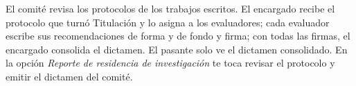 \documentclass[11pt,a4paper]{article}
\begin{document}
{\small\tableofcontents}
\newpage
\begin{quevasahacer}
El comité revisa los protocolos de los trabajos escritos. El encargado recibe el protocolo que turnó Titulación y lo asigna a los evaluadores; cada evaluador escribe sus recomendaciones de forma y de fondo y firma; con todas las firmas, el encargado consolida el dictamen. El pasante solo ve el dictamen consolidado. En la opción \emph{Reporte de residencia de investigación} te toca revisar el protocolo y emitir el dictamen del comité.
\end{quevasahacer}



\end{document}
